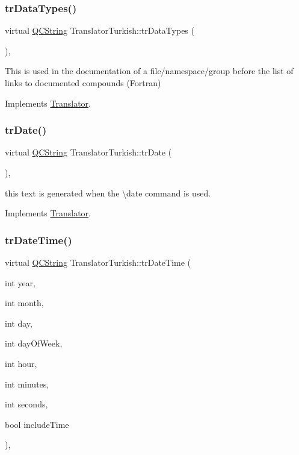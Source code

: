 \subsubsection{\texorpdfstring{trDataTypes()}{trDataTypes()}}
{\footnotesize\ttfamily virtual \mbox{\hyperlink{class_q_c_string}{Q\+C\+String}} Translator\+Turkish\+::tr\+Data\+Types (\begin{DoxyParamCaption}{ }\end{DoxyParamCaption})\hspace{0.3cm}{\ttfamily [inline]}, {\ttfamily [virtual]}}

This is used in the documentation of a file/namespace/group before the list of links to documented compounds (Fortran) 

Implements \mbox{\hyperlink{class_translator}{Translator}}.

\mbox{\label{class_translator_turkish_a41108f71acc619785c93970c6a82f920}} 
\subsubsection{\texorpdfstring{trDate()}{trDate()}}
{\footnotesize\ttfamily virtual \mbox{\hyperlink{class_q_c_string}{Q\+C\+String}} Translator\+Turkish\+::tr\+Date (\begin{DoxyParamCaption}{ }\end{DoxyParamCaption})\hspace{0.3cm}{\ttfamily [inline]}, {\ttfamily [virtual]}}

this text is generated when the \textbackslash{}date command is used. 

Implements \mbox{\hyperlink{class_translator}{Translator}}.

\mbox{\label{class_translator_turkish_a5d517565cb0e2aa4dfc9d070f0788776}} 
\subsubsection{\texorpdfstring{trDateTime()}{trDateTime()}}
{\footnotesize\ttfamily virtual \mbox{\hyperlink{class_q_c_string}{Q\+C\+String}} Translator\+Turkish\+::tr\+Date\+Time (\begin{DoxyParamCaption}\item[{int}]{year,  }\item[{int}]{month,  }\item[{int}]{day,  }\item[{int}]{day\+Of\+Week,  }\item[{int}]{hour,  }\item[{int}]{minutes,  }\item[{int}]{seconds,  }\item[{bool}]{include\+Time }\end{DoxyParamCaption})\hspace{0.3cm}{\ttfamily [inline]}, {\ttfamily [virtual]}}

